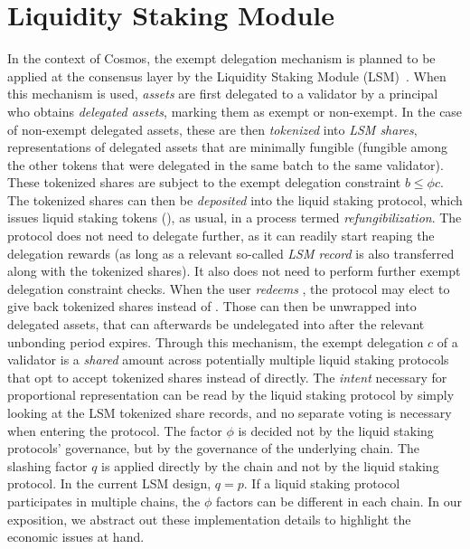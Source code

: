 \section{Liquidity Staking Module}\label{sec:lsm}


In the context
of Cosmos, the exempt delegation mechanism is planned to be applied at the consensus
layer by the Liquidity Staking Module (LSM)~\cite{liquidity-staking-module}.
When this mechanism is used, \emph{assets} are first delegated to a validator by
a principal who obtains \emph{delegated assets}, marking them as exempt or non-exempt.
In the case of non-exempt delegated assets, these are then
\emph{tokenized} into \emph{LSM shares}, representations of delegated assets that
are minimally fungible (fungible among the other tokens that were delegated in the
same batch to the same validator). These tokenized
shares are subject to the exempt delegation constraint $b \leq \phi c$. The tokenized shares
can then be \emph{deposited} into the liquid staking protocol, which issues liquid staking
tokens (\stassets), as usual, in a process termed \emph{refungibilization}.
The protocol does not need to delegate further, as it can readily start reaping the
delegation rewards (as long as a relevant so-called \emph{LSM record} is also transferred
along with the tokenized shares).
It also does not need to perform further exempt delegation constraint checks.
When the user \emph{redeems} \stassets, the protocol may elect to give
back tokenized shares instead of \assets. Those can then be unwrapped into delegated assets,
that can afterwards be undelegated into \assets after the relevant unbonding
period expires.
Through this mechanism, the exempt delegation $c$ of a validator is
a \emph{shared} amount across potentially multiple liquid staking
protocols that opt to accept tokenized shares
instead of \assets directly. The \emph{intent} necessary for proportional
representation can be read by the liquid staking protocol by simply
looking at the LSM tokenized share records, and no separate voting is
necessary when entering the protocol. The factor $\phi$ is decided not by the
liquid staking protocols' governance, but by the governance of
the underlying chain. The slashing factor $q$ is applied directly
by the chain and not by the liquid staking protocol.
In the current LSM design, $q = p$.
If a liquid staking protocol participates in
multiple chains, the $\phi$ factors can be different in each chain.
In our exposition, we abstract out these implementation details to highlight
the economic issues at hand.

